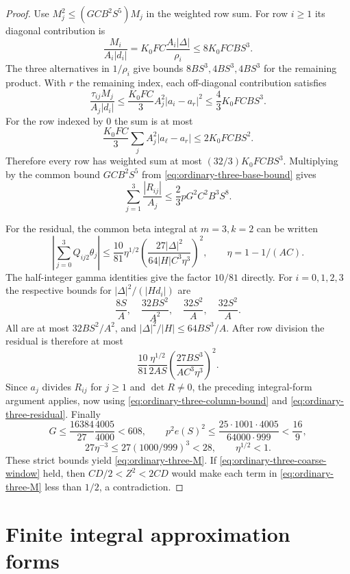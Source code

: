 \documentclass[12pt]{article}
\numberwithin{equation}{section}
\begin{document}
\begin{proof}
Use $M_j^2\le(GCB^2S^5)M_j$ in the weighted row sum.  For row $i\ge1$ its
diagonal contribution is
\[
 \frac{M_i}{A_i|d_i|}
 =K_0FC\frac{A_i|\Delta|}{\rho_i}\le8K_0FCBS^3.
\]
The three alternatives in $1/\rho_i$ give bounds $8BS^3,4BS^3,4BS^3$
for the remaining product.  With $r$ the remaining index, each
off-diagonal contribution satisfies
\[
 \frac{\tau_{ij}M_j}{A_j|d_i|}
 \le\frac{K_0FC}{3}A_j^2|a_i-a_r|^2
 \le\frac43K_0FCBS^3.
\]
For the row indexed by $0$ the sum is at most
\[
 \frac{K_0FC}{3}\sum_j A_j^2|a_\ell-a_r|
 \le2K_0FCBS^2.
\]
Therefore every row has weighted sum at most
$(32/3)K_0FCBS^3$.  Multiplying by the common bound $GCB^2S^5$ from \eqref{eq:ordinary-three-base-bound} gives
\begin{equation}\label{eq:ordinary-three-column-bound}
 \sum_{j=1}^3\frac{|R_{ij}|}{A_j}
 \le\frac23pG^2C^2B^3S^8.
\end{equation}

For the residual, the common beta integral at $m=3,k=2$ can be written
\[
 \left|\sum_{j=0}^3Q_{ij2}\theta_j\right|
 \le\frac{10}{81}\eta^{1/2}
       \left(\frac{27|\Delta|^2}{64|H|C^3\eta^3}\right)^2,
 \qquad\eta=1-1/(AC).
\]
The half-integer gamma identities give the factor $10/81$ directly.
For $i=0,1,2,3$ the respective bounds for
$|\Delta|^2/(|H d_i|)$ are
\[
 \frac{8S}{A},\quad\frac{32BS^2}{A^2},\quad
 \frac{32S^2}{A},\quad\frac{32S^2}{A}.
\]
All are at most $32BS^2/A^2$, and
$|\Delta|^2/|H|\le64BS^3/A$.  After row division the residual is
therefore at most
\begin{equation}\label{eq:ordinary-three-residual}
 \frac{10}{81}\frac{\eta^{1/2}}{2AS}
       \left(\frac{27BS^3}{AC^3\eta^3}\right)^2.
\end{equation}
Since $a_j$ divides $R_{ij}$ for $j\ge1$ and $\det R\ne0$, the preceding integral-form argument applies, now using
\eqref{eq:ordinary-three-column-bound} and
\eqref{eq:ordinary-three-residual}.  Finally
\[
 G\le\frac{16384}{27}\frac{4005}{4000}<608,
 \qquad
 p^2e(S)^2\le
 \frac{25\cdot1001\cdot4005}{64000\cdot999}<\frac{16}{9},
\]
\[
 27\eta^{-3}\le27(1000/999)^3<28,
 \qquad\eta^{1/2}<1.
\]
These strict bounds yield \eqref{eq:ordinary-three-M}.
If \eqref{eq:ordinary-three-coarse-window} held, then
$CD/2<Z^2<2CD$ would make each term in
\eqref{eq:ordinary-three-M} less than $1/2$, a contradiction.
\end{proof}

\section{Finite integral approximation forms}
\end{document}
